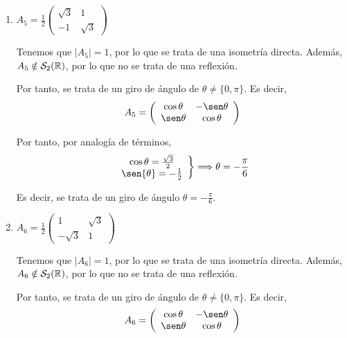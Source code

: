 \begin{ejercicio}
\begin{enumerate}
        \item $A_5=\frac{1}{2}\left(\begin{array}{cc}
            \sqrt{3} & 1 \\
            -1 & \sqrt{3}
        \end{array}\right)$

        Tenemos que $|A_5|=1$, por lo que se trata de una isometría directa. Además, $A_5\notin \mathcal{S}_2(\mathbb{R})$, por lo que no se trata de una reflexión.

        Por tanto, se trata de un giro de ángulo de $\theta\neq \{0,\pi\}$. Es decir,
        \begin{equation*}
            A_5=\left(\begin{array}{cc}
                \cos \theta & -\sen \theta \\
                \sen \theta & \cos \theta
            \end{array}\right)
        \end{equation*}

        Por tanto, por analogía de términos,
        \begin{equation*}
            \left.\begin{array}{c}
                \cos{\theta} = \frac{\sqrt{3}}{2} \\
                \sen{\theta} = -\frac{1}{2}
            \end{array}\right\} \Longrightarrow \theta = -\frac{\pi}{6}
        \end{equation*}
        
        Es decir, se trata de un giro de ángulo $\theta=-\frac{\pi}{6}$.



        \item $A_6=\frac{1}{2}\left(\begin{array}{cc}
            1  & \sqrt{3}\\
            -\sqrt{3} & 1
        \end{array}\right)$

        Tenemos que $|A_6|=1$, por lo que se trata de una isometría directa. Además, $A_6\notin \mathcal{S}_2(\mathbb{R})$, por lo que no se trata de una reflexión.

        Por tanto, se trata de un giro de ángulo de $\theta\neq \{0,\pi\}$. Es decir,
        \begin{equation*}
            A_6=\left(\begin{array}{cc}
                \cos \theta & -\sen \theta \\
                \sen \theta & \cos \theta
            \end{array}\right)
        \end{equation*}


\end{enumerate}
\end{ejercicio}
